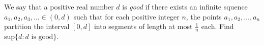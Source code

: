 We say that a positive real number \(d\) is \emph{good} if there exists an infinite squence \(a_1,a_2,a_3,\dots\in (0,d)\) such that for each positive integer \(n\), the points \(a_1,a_2,\dots,a_n\) partition the interval \([0,d]\) into segments of length at most \(\frac{1}{n}\) each. Find \(\text{sup}\{d : d  \text{ is  good}\}\).
